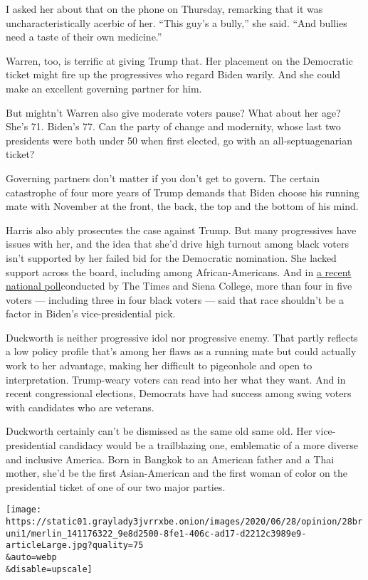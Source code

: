I asked her about that on the phone on Thursday, remarking that it was
uncharacteristically acerbic of her. ``This guy's a bully,'' she said.
``And bullies need a taste of their own medicine.''

Warren, too, is terrific at giving Trump that. Her placement on the
Democratic ticket might fire up the progressives who regard Biden
warily. And she could make an excellent governing partner for him.

But mightn't Warren also give moderate voters pause? What about her age?
She's 71. Biden's 77. Can the party of change and modernity, whose last
two presidents were both under 50 when first elected, go with an
all-septuagenarian ticket?

Governing partners don't matter if you don't get to govern. The certain
catastrophe of four more years of Trump demands that Biden choose his
running mate with November at the front, the back, the top and the
bottom of his mind.

Harris also ably prosecutes the case against Trump. But many
progressives have issues with her, and the idea that she'd drive high
turnout among black voters isn't supported by her failed bid for the
Democratic nomination. She lacked support across the board, including
among African-Americans. And in
\href{https://www.nytimes3xbfgragh.onion/2020/06/26/us/politics/biden-vice-president-voters.html}{a
recent national poll}conducted by The Times and Siena College, more than
four in five voters --- including three in four black voters --- said
that race shouldn't be a factor in Biden's vice-presidential pick.

Duckworth is neither progressive idol nor progressive enemy. That partly
reflects a low policy profile that's among her flaws as a running mate
but could actually work to her advantage, making her difficult to
pigeonhole and open to interpretation. Trump-weary voters can read into
her what they want. And in recent congressional elections, Democrats
have had success among swing voters with candidates who are veterans.

Duckworth certainly can't be dismissed as the same old same old. Her
vice-presidential candidacy would be a trailblazing one, emblematic of a
more diverse and inclusive America. Born in Bangkok to an American
father and a Thai mother, she'd be the first Asian-American and the
first woman of color on the presidential ticket of one of our two major
parties.

\texttt{[image: https://static01.graylady3jvrrxbe.onion/images/2020/06/28/opinion/28bruni1/merlin\_141176322\_9e8d2500-8fe1-406c-ad17-d2212c3989e9-articleLarge.jpg?quality=75\\\&auto=webp\\\&disable=upscale]}

